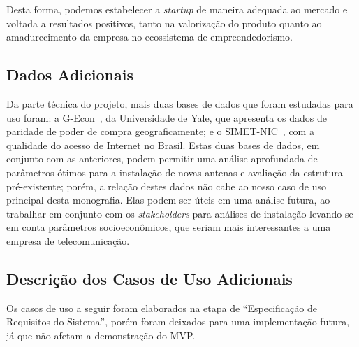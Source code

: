 \documentclass[]{politex}
\begin{document}
Desta forma, podemos estabelecer a \textit{startup} de maneira adequada ao
mercado e voltada a resultados positivos, tanto na valorização do produto quanto
ao amadurecimento da empresa no ecossistema de empreendedorismo.

\subsection{Dados Adicionais}

Da parte técnica do projeto, mais duas bases de dados que foram estudadas para
uso foram: a G-Econ~\cite{gecon}, da Universidade de Yale, que apresenta os dados de paridade de
poder de compra geograficamente; e o SIMET-NIC~\cite{simet}, com a qualidade do
acesso de Internet no Brasil. Estas duas bases de dados, em conjunto com as
anteriores, podem permitir uma análise aprofundada de parâmetros ótimos para a
instalação de novas antenas e avaliação da estrutura pré-existente; porém,
a relação destes dados não cabe ao nosso caso de uso principal desta monografia. Elas podem
ser úteis em uma análise futura, ao trabalhar em conjunto com os
\textit{stakeholders} para análises de instalação levando-se em conta parâmetros socioeconômicos,
que seriam mais interessantes a uma empresa de telecomunicação.

\subsection{Descrição dos Casos de Uso Adicionais}


Os casos de uso a seguir foram elaborados na etapa de ``Especificação de
Requisitos do Sistema'', porém foram deixados para uma implementação futura, já
que não afetam a demonstração do MVP.
\end{document}
